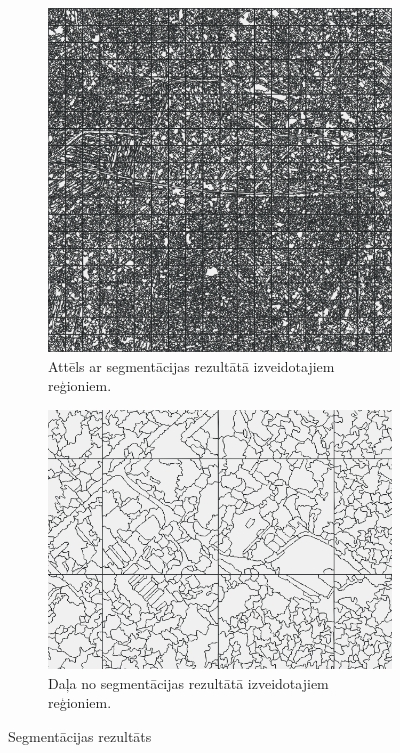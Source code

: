 \documentclass[12pt,paper=a4]{report}
\begin{document}
\begin{figure}[h!]
\centering
\begin{subfigure}[b]{.41\linewidth}
\includegraphics[width=\linewidth]{vissPolygons}
\caption{Attēls ar segmentācijas rezultātā izveidotajiem reģioniem.}
\label{fig:regionsFull}
\end{subfigure}
\begin{subfigure}[b]{.54\linewidth}
\includegraphics[width=\linewidth]{regionFragments}
\caption{Daļa no segmentācijas rezultātā izveidotajiem reģioniem. \\}
\label{fig:regionsPart}
\end{subfigure}
\caption{Segmentācijas rezultāts}
\label{fig:regions}
\end{figure}
\end{document}
